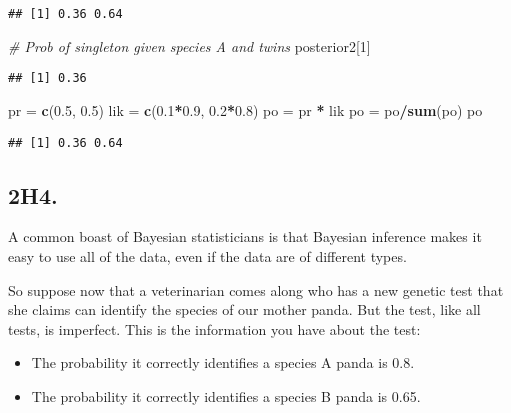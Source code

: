 \documentclass[
]{book}
\newenvironment{Shaded}{\begin{snugshade}}{\end{snugshade}}
\newcommand{\CommentTok}[1]{\textcolor[rgb]{0.56,0.35,0.01}{\textit{#1}}}
\newcommand{\DecValTok}[1]{\textcolor[rgb]{0.00,0.00,0.81}{#1}}
\newcommand{\FloatTok}[1]{\textcolor[rgb]{0.00,0.00,0.81}{#1}}
\newcommand{\KeywordTok}[1]{\textcolor[rgb]{0.13,0.29,0.53}{\textbf{#1}}}
\newcommand{\NormalTok}[1]{#1}
\newcommand{\OperatorTok}[1]{\textcolor[rgb]{0.81,0.36,0.00}{\textbf{#1}}}
\newcommand{\StringTok}[1]{\textcolor[rgb]{0.31,0.60,0.02}{#1}}
\providecommand{\tightlist}{%
  \setlength{\itemsep}{0pt}\setlength{\parskip}{0pt}}
\begin{document}
\begin{verbatim}
## [1] 0.36 0.64
\end{verbatim}

\begin{Shaded}
\begin{Highlighting}[]
\CommentTok{# Prob of singleton given species A and twins}
\NormalTok{posterior2[}\DecValTok{1}\NormalTok{]}
\end{Highlighting}
\end{Shaded}

\begin{verbatim}
## [1] 0.36
\end{verbatim}

\begin{Shaded}
\begin{Highlighting}[]
\NormalTok{pr =}\StringTok{ }\KeywordTok{c}\NormalTok{(}\FloatTok{0.5}\NormalTok{, }\FloatTok{0.5}\NormalTok{)}
\NormalTok{lik =}\StringTok{ }\KeywordTok{c}\NormalTok{(}\FloatTok{0.1}\OperatorTok{*}\FloatTok{0.9}\NormalTok{, }\FloatTok{0.2}\OperatorTok{*}\FloatTok{0.8}\NormalTok{)}
\NormalTok{po =}\StringTok{ }\NormalTok{pr }\OperatorTok{*}\StringTok{ }\NormalTok{lik}
\NormalTok{po =}\StringTok{ }\NormalTok{po}\OperatorTok{/}\KeywordTok{sum}\NormalTok{(po)}
\NormalTok{po}
\end{Highlighting}
\end{Shaded}

\begin{verbatim}
## [1] 0.36 0.64
\end{verbatim}

\hypertarget{h4.}{%
\subsection{2H4.}\label{h4.}}

A common boast of Bayesian statisticians is that Bayesian inference makes it easy to use all of the data, even if the data are of different types.

So suppose now that a veterinarian comes along who has a new genetic test that she claims can identify the species of our mother panda. But the test, like all tests, is imperfect. This is the information you have about the test:

\begin{itemize}
\tightlist
\item
  The probability it correctly identifies a species A panda is 0.8.
\item
  The probability it correctly identifies a species B panda is 0.65.
\end{itemize}
\end{document}
